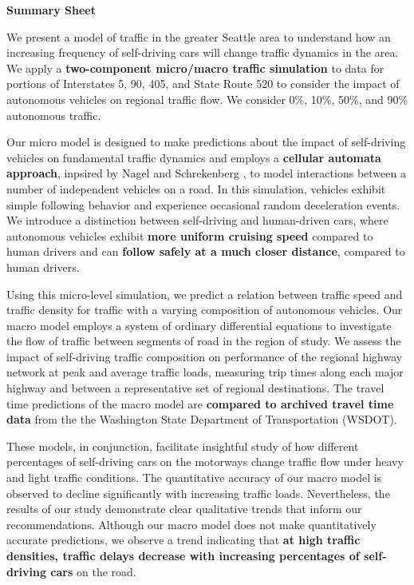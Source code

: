 {
\centering 
\textbf{Summary Sheet} \par
}

We present a model of traffic in the greater Seattle area to understand how an increasing frequency of self-driving cars will change traffic dynamics in the area.  We apply a \textbf{two-component micro/macro traffic simulation} to data for portions of Interstates 5, 90, 405, and State Route 520 to consider the impact of autonomous vehicles on regional traffic flow. We consider 0\%, 10\%, 50\%, and 90\% autonomous traffic.

Our micro model is designed to make predictions about the impact of self-driving vehicles on fundamental traffic dynamics and employs a \textbf{cellular automata approach}, inpsired by Nagel and Schrekenberg \cite{Nagel1992ATraffic}, to model interactions between a number of independent vehicles on a road. In this simulation, vehicles exhibit simple following behavior and experience occasional random deceleration events. We introduce a distinction between self-driving and human-driven cars, where autonomous vehicles exhibit \textbf{more uniform cruising speed} compared to human drivers and can \textbf{follow safely at a much closer distance}, compared to human drivers. 

Using this micro-level simulation, we predict a relation between traffic speed and traffic density for traffic with a varying composition of autonomous vehicles. Our macro model employs a system of ordinary differential equations to investigate the flow of traffic between segments of road in the region of study. We assess the impact of self-driving traffic composition on performance of the regional highway network at peak and average traffic loads, measuring trip times along each major highway and between a representative set of regional destinations. The travel time predictions of the macro model are \textbf{compared to archived travel time data} from the the Washington State Department of Transportation (WSDOT).

These models, in conjunction, facilitate insightful study of how different percentages of self-driving cars on the motorways change traffic flow under heavy and light traffic conditions. The quantitative accuracy of our macro model is observed to decline significantly with increasing traffic loads. Nevertheless, the results of our study demonstrate clear qualitative trends that inform our recommendations. Although our macro model does not make quantitatively accurate predictions, we observe a trend indicating that \textbf{at high traffic densities, traffic delays decrease with increasing percentages of self-driving cars} on the road. 

